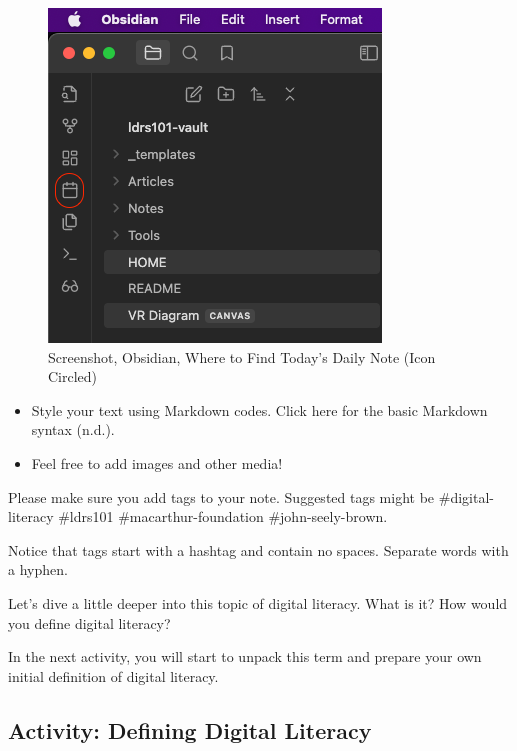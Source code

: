 \documentclass[
  letterpaper,
  DIV=11,
  numbers=noendperiod]{scrreprt}
\providecommand{\tightlist}{%
  \setlength{\itemsep}{0pt}\setlength{\parskip}{0pt}}\usepackage{longtable,booktabs,array}
\begin{document}
\begin{tcolorbox}
\begin{figure}[H]

\caption{\label{fig-tdn}Screenshot, Obsidian, Where to Find Today's
Daily Note (Icon Circled)}

\includegraphics{assets/u1/tdn.png}

\end{figure}%

\begin{itemize}
\tightlist
\item
  Style your text using Markdown codes. Click here for the basic
  Markdown syntax (n.d.).
\item
  Feel free to add images and other media!
\end{itemize}

Please make sure you add tags to your note. Suggested tags might be
\#digital-literacy \#ldrs101 \#macarthur-foundation \#john-seely-brown.

Notice that tags start with a hashtag and contain no spaces. Separate
words with a hyphen.

\end{tcolorbox}

Let's dive a little deeper into this topic of digital literacy. What is
it? How would you define digital literacy?

In the next activity, you will start to unpack this term and prepare
your own initial definition of digital literacy.

\subsection{Activity: Defining Digital
Literacy}\label{activity-defining-digital-literacy}
\end{document}
